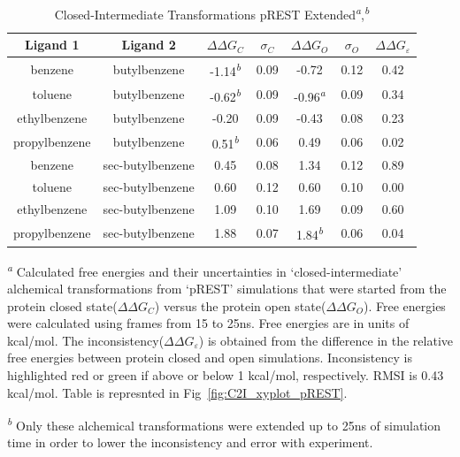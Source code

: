 \begin{table}[!htb]
\centering
\caption{Closed-Intermediate Transformations pREST Extended\textsuperscript{\emph{a}},\textsuperscript{\emph{b}}}
\label{tbl:C-I_pRESText}
\begin{tabular}{|c|c|c|c|c|c|c|}
\hline
\textbf{Ligand 1}       & \textbf{Ligand 2}    & \boldmath$\Delta\Delta G_{C}$ & \boldmath$\sigma_{C}$ & \boldmath$\Delta\Delta G_{O}$ & \boldmath$\sigma_{O}$ & \boldmath$\Delta\Delta G_{\varepsilon}$ \\ \hline
benzene          & butylbenzene   & -1.14\textsuperscript{\emph{b}}    & 0.09  & -0.72   & 0.12  & \cellcolor[HTML]{9AFF99}0.42 \\ \hline
toluene          & butylbenzene   & -0.62\textsuperscript{\emph{b}}    & 0.09  & -0.96\textsuperscript{\emph{a}}  & 0.09  & \cellcolor[HTML]{9AFF99}0.34 \\ \hline
ethylbenzene     & butylbenzene   & -0.20     & 0.09  & -0.43   & 0.08  & \cellcolor[HTML]{9AFF99}0.23 \\ \hline
propylbenzene  & butylbenzene   & 0.51\textsuperscript{\emph{b}}     & 0.06  & 0.49    & 0.06  & \cellcolor[HTML]{9AFF99}0.02 \\ \hline
benzene          & sec-butylbenzene & 0.45      & 0.08  & 1.34    & 0.12  & \cellcolor[HTML]{9AFF99}0.89 \\ \hline
toluene          & sec-butylbenzene & 0.60      & 0.12  & 0.60    & 0.10  & \cellcolor[HTML]{9AFF99}0.00 \\ \hline
ethylbenzene     & sec-butylbenzene & 1.09      & 0.10  & 1.69    & 0.09  & \cellcolor[HTML]{9AFF99}0.60 \\ \hline
propylbenzene  & sec-butylbenzene & 1.88      & 0.07  & 1.84\textsuperscript{\emph{b}}   & 0.06  & \cellcolor[HTML]{9AFF99}0.04 \\ \hline
\end{tabular}
 
\textsuperscript{\emph{a}} Calculated free energies and their uncertainties in `closed-intermediate' alchemical transformations from `pREST' simulations that were started from the protein closed state(\boldmath$\Delta\Delta G_{C}$) versus the protein open state(\boldmath$\Delta\Delta G_{O}$).
Free energies were calculated using frames from 15 to 25ns. 
Free energies are in units of kcal/mol.
The inconsistency(\boldmath$\Delta\Delta G_{\varepsilon}$) is obtained from the difference in the relative free energies between protein closed and open simulations. 
Inconsistency is highlighted red or green if above or below 1 kcal/mol, respectively.
RMSI is 0.43 kcal/mol.
Table is represnted in Fig~\ref{fig:C2I_xyplot_pREST}.

\textsuperscript{\emph{b}} Only these alchemical transformations were extended up to 25ns of simulation time in order to lower the inconsistency and error with experiment.
\end{table}

